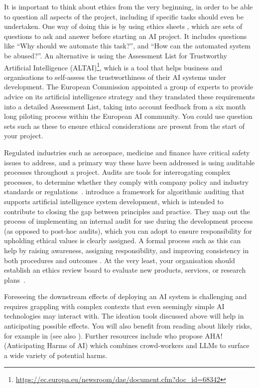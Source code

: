 It is important to think about ethics from the very beginning, in order to be able to question all aspects of the project, including if specific tasks should even be undertaken.  One way of doing this is by using ethics sheets \citep{mohammad_ethics_2022}, which are sets of questions to ask and answer before starting an AI project. It includes questions like ``Why should we automate this task?'', and ``How can the automated system be abused?''. 
An alternative is using the Assessment List for Trustworthy Artificial Intelligence (ALTAI)\footnote{\url{https://ec.europa.eu/newsroom/dae/document.cfm?doc_id=68342}}, which is a tool that helps business and organisations to self-assess the trustworthiness of their AI systems under development. The European Commission appointed a group of experts to provide advice on its artificial intelligence strategy and they translated these requirements into a detailed Assessment List, taking into account feedback from a six month long piloting process within the European AI community. 
You could use question sets such as these to ensure ethical considerations are present from the start of your project. 

Regulated industries such as aerospace, medicine and finance have critical safety issues to address, and a primary way these have been addressed is using auditable processes throughout a project. Audits are tools for interrogating complex processes, to determine whether they comply with company policy and industry standards or regulations~\citep{liu2012enterprise}. \citet{raji_closing_2020} introduce a framework for algorithmic auditing that supports artificial intelligence system development, which is intended to contribute to closing the gap between principles and practice. They map out the process of implementing an internal audit for use during the development process (as opposed to post-hoc audits), which you can adopt to ensure responsibility for upholding ethical values is clearly assigned. A formal process such as this can help by raising awareness, assigning responsibility, and improving consistency in both procedures and outcomes \citep{leidner_ethical_2017}. At the very least, your organisation should establish an ethics review board to evaluate new products, services, or research plans~\citep{raji_closing_2020}.

Foreseeing the downstream effects of deploying an AI system is challenging and requires grappling with complex contexts that even seemingly simple AI technologies may interact with. The ideation tools discussed above will help in anticipating possible effects. You will also benefit from reading about likely risks, for example in \citet{Solaiman_Evaluating_2024} (see also ). Further resources include \citet{bucinca_aha_2023} who propose AHA! (Anticipating Harms of AI) which combines crowd-workers and LLMs to surface a wide variety of potential harms.


